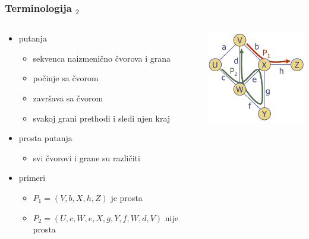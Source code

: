 \documentclass[compress,aspectratio=169]{beamer}
\begin{document}
\begin{frame}[fragile]
  \frametitle{Terminologija $_{2}$}
  \begin{columns}
    \begin{column}[t]{7.5cm}
      \begin{itemize}
        \item putanja
        \begin{itemize}
          \item sekvenca naizmenično čvorova i grana
          \item počinje sa čvorom
          \item završava sa čvorom
          \item svakoj grani prethodi i sledi njen kraj
        \end{itemize}
        \item prosta putanja
        \begin{itemize}
          \item svi čvorovi i grane su različiti
        \end{itemize}
        \item primeri
        \begin{itemize}
          \item $P_{1}=(V,b,X,h,Z)$ je prosta
          \item $P_{2}=(U,c,W,e,X,g,Y,f,W,d,V)$ nije prosta
        \end{itemize}
      \end{itemize}
    \end{column}
    \begin{column}[t]{4.5cm}
      \begin{center}
        \includegraphics[width=4.5cm]{asp-14-pic05.png}
      \end{center}
    \end{column}
  \end{columns}
\end{frame}
\end{document}
